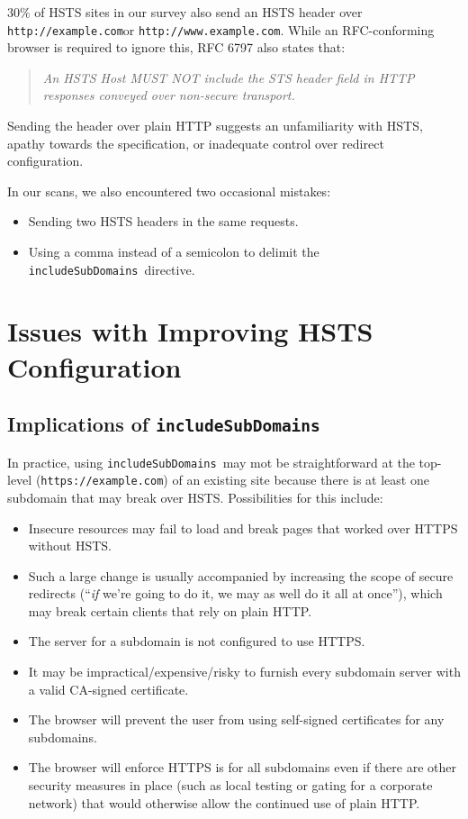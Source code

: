 \documentclass[conference]{./IEEEtran}
\newcommand{\site}[1]{\texttt{#1}}
\newcommand{\code}[1]{\texttt{#1}}
\newcommand{\iSD}{{\code{includeSubDomains}}}
\newcommand{\genericsite}{example.com}
\newcommand{\h}{{\site{http://\genericsite}}}
\newcommand{\s}{{\site{https://\genericsite}}}
\newcommand{\hw}{{\site{http://www.\genericsite}}}
\theoremstyle{plain}
\begin{document}
$30\%$ of HSTS sites in our survey also send an HSTS header over \h or \hw. While an RFC-conforming browser is required to ignore this, RFC 6797\cite{rfc} also states that:

\begin{quotation}\it
An HSTS Host MUST NOT include the STS header field in HTTP responses conveyed over non-secure transport.
\end{quotation}

Sending the header over plain HTTP suggests an unfamiliarity with HSTS, apathy towards the specification, or inadequate control over redirect configuration.

In our scans, we also encountered two occasional mistakes:

\begin{itemize}
\item Sending two HSTS headers in the same requests.
\item Using a comma instead of a semicolon to delimit the \iSD~directive.
\end{itemize}


\section{Issues with Improving HSTS Configuration}

\subsection{Implications of \iSD}
\label{includeSubDomains-issues}

In practice, using \iSD~may mot be straightforward at the top-level (\s) of an existing site because there is at least one subdomain that may break over HSTS. Possibilities for this include:

\begin{itemize}
\item Insecure resources may fail to load and break pages that worked over HTTPS without HSTS.
\item Such a large change is usually accompanied by increasing the scope of secure redirects (``\emph{if} we're going to do it, we may as well do it all at once''), which may break certain clients that rely on plain HTTP.\item The server for a subdomain is not configured to use HTTPS.
\item It may be impractical/expensive/risky to furnish every subdomain server with a valid CA-signed certificate.
\item The browser will prevent the user from using self-signed certificates for any subdomains.
\item The browser will enforce HTTPS is for all subdomains even if there are other security measures in place (such as local testing or gating for a corporate network) that would otherwise allow the continued use of plain HTTP.
\end{itemize}
\end{document}
